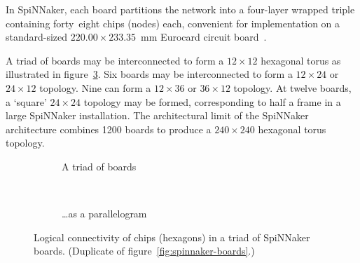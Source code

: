 		In SpiNNaker, each board partitions the network into a four-layer wrapped
		triple containing forty~eight chips (nodes) each, convenient for
		implementation on a standard-sized $220.00\times233.35$~\si{\milli\meter}
		Eurocard circuit board~\cite{ieee11011}.
		
		A triad of boards may be interconnected to form a $12\times12$ hexagonal
		torus as illustrated in figure~\ref{fig:threeboard-apdx}. Six boards may be
		interconnected to form a $12\times24$ or $24\times12$ topology. Nine can
		form a $12\times36$ or $36\times12$ topology. At twelve boards, a `square'
		$24\times24$ topology may be formed, corresponding to half a frame in a
		large SpiNNaker installation. The architectural limit of the SpiNNaker
		architecture combines \num{1200} boards to produce a $240\times240$
		hexagonal torus topology.
		
		\begin{figure}
			\center
			\begin{subfigure}[b]{0.45\linewidth}
				\center
				
				\caption{A triad of boards}
				\label{fig:threeboard-separate-apdx}
			\end{subfigure}
			~~~
			\begin{subfigure}[b]{0.45\linewidth}
				\center
				
				\caption{\ldots{}as a parallelogram}
				\label{fig:threeboard-wrapped-apdx}
			\end{subfigure}
			
			\caption[Logical connectivity of chips in a triad of SpiNNaker boards.]%
			{Logical connectivity of chips (hexagons) in a triad of SpiNNaker
			boards. (Duplicate of figure~\ref{fig:spinnaker-boards}.)}
			\label{fig:threeboard-apdx}
		\end{figure}
